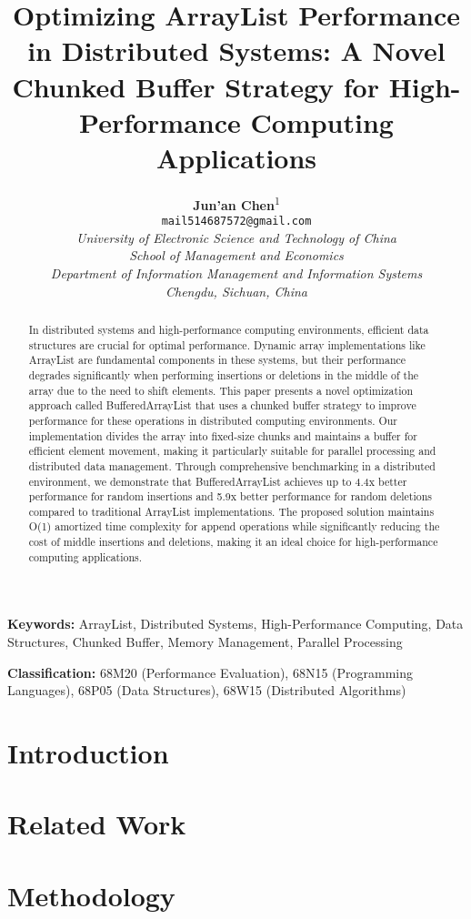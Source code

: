 \documentclass[twocolumn]{article}
\title{Optimizing ArrayList Performance in Distributed Systems: A Novel Chunked Buffer Strategy for High-Performance Computing Applications}
\author{
    \textbf{Jun'an Chen}\textsuperscript{1} \\
    \texttt{mail514687572@gmail.com} \\
    \textit{University of Electronic Science and Technology of China} \\
    \textit{School of Management and Economics} \\
    \textit{Department of Information Management and Information Systems} \\
    \textit{Chengdu, Sichuan, China}
}
\date{}
\begin{document}
\maketitle

\begin{abstract}
In distributed systems and high-performance computing environments, efficient data structures are crucial for optimal performance. Dynamic array implementations like ArrayList are fundamental components in these systems, but their performance degrades significantly when performing insertions or deletions in the middle of the array due to the need to shift elements. This paper presents a novel optimization approach called BufferedArrayList that uses a chunked buffer strategy to improve performance for these operations in distributed computing environments. Our implementation divides the array into fixed-size chunks and maintains a buffer for efficient element movement, making it particularly suitable for parallel processing and distributed data management. Through comprehensive benchmarking in a distributed environment, we demonstrate that BufferedArrayList achieves up to 4.4x better performance for random insertions and 5.9x better performance for random deletions compared to traditional ArrayList implementations. The proposed solution maintains O(1) amortized time complexity for append operations while significantly reducing the cost of middle insertions and deletions, making it an ideal choice for high-performance computing applications.
\end{abstract}

\textbf{Keywords:} ArrayList, Distributed Systems, High-Performance Computing, Data Structures, Chunked Buffer, Memory Management, Parallel Processing

\textbf{Classification:} 68M20 (Performance Evaluation), 68N15 (Programming Languages), 68P05 (Data Structures), 68W15 (Distributed Algorithms)

\tableofcontents

\section{Introduction}


\section{Related Work}


\section{Methodology}

\end{document}
